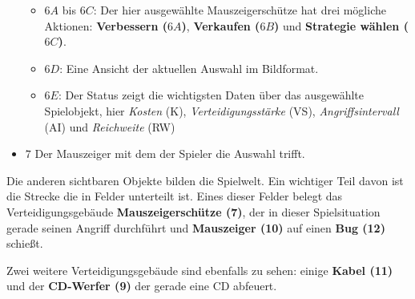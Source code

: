 \begin{itemize}[leftmargin=*]
\begin{itemize}
		\item{$6 A$ bis $6 C$: Der hier ausgewählte Mauszeigerschütze hat drei mögliche Aktionen: \textbf{Verbessern ($6 A$)}, \textbf{Verkaufen ($6 B$)} und \textbf{Strategie wählen ($6 C$)}.}
		\item{$6 D$: Eine Ansicht der aktuellen Auswahl im Bildformat.}
		\item{$6 E$: Der Status zeigt die wichtigsten Daten über das ausgewählte Spielobjekt, hier \textit{Kosten} (K), \textit{Verteidigungsstärke} (VS), \textit{Angriffsintervall }(AI) und \textit{Reichweite} (RW)}
	\end{itemize}
	\item {$7$ Der Mauszeiger mit dem der Spieler die Auswahl trifft.}
\end{itemize}
Die anderen sichtbaren Objekte bilden die Spielwelt. Ein wichtiger Teil davon ist die Strecke die in Felder unterteilt ist. Eines dieser Felder belegt das Verteidigungsgebäude \textbf{Mauszeigerschütze (7)}, der in dieser Spielsituation gerade seinen Angriff durchführt und \textbf{Mauszeiger (10)} auf einen \textbf{Bug (12)} schießt.

Zwei weitere Verteidigungsgebäude sind ebenfalls zu sehen: einige \textbf{Kabel (11)} und der \textbf{CD-Werfer (9)} der gerade eine CD abfeuert.
